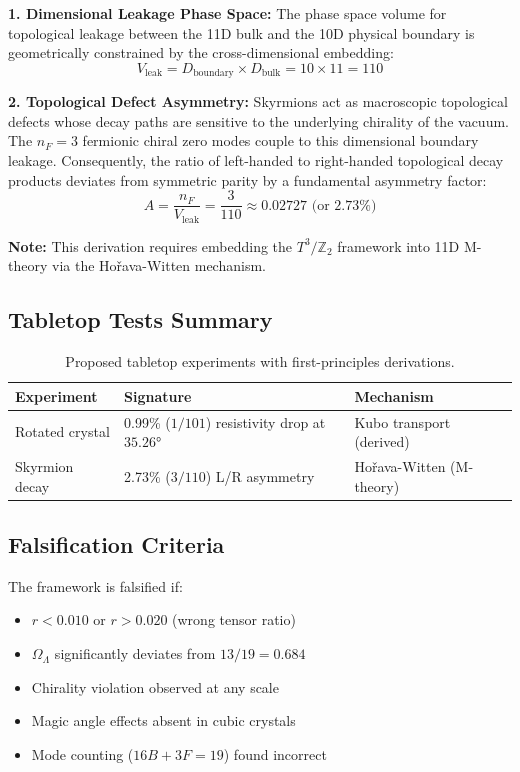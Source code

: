 \documentclass[12pt,a4paper]{article}
\newcommand{\Ztwo}{\mathbb{Z}_2}
\newcommand{\Tthree}{T^3}
\newcommand{\OmegaL}{\Omega_\Lambda}
\newcommand{\nF}{n_F}
\begin{document}
\textbf{1. Dimensional Leakage Phase Space:}
The phase space volume for topological leakage between the 11D bulk and the 10D physical boundary is geometrically constrained by the cross-dimensional embedding:
\begin{equation}
V_{\text{leak}} = D_{\text{boundary}} \times D_{\text{bulk}} = 10 \times 11 = 110
\end{equation}

\textbf{2. Topological Defect Asymmetry:}
Skyrmions act as macroscopic topological defects whose decay paths are sensitive to the underlying chirality of the vacuum. The $\nF = 3$ fermionic chiral zero modes couple to this dimensional boundary leakage. Consequently, the ratio of left-handed to right-handed topological decay products deviates from symmetric parity by a fundamental asymmetry factor:
\begin{equation}
A = \frac{\nF}{V_{\text{leak}}} = \frac{3}{110} \approx 0.02727 \text{ (or } 2.73\%)
\end{equation}

\textbf{Note:} This derivation requires embedding the $\Tthree/\Ztwo$ framework into 11D M-theory via the Hořava-Witten mechanism.

\subsection{Tabletop Tests Summary}

\begin{table}[H]
\centering
\begin{tabular}{lll}
\toprule
\textbf{Experiment} & \textbf{Signature} & \textbf{Mechanism} \\
\midrule
Rotated crystal & 0.99\% ($1/101$) resistivity drop at $35.26°$ & Kubo transport (derived) \\
Skyrmion decay & 2.73\% ($3/110$) L/R asymmetry & Hořava-Witten (M-theory) \\
\bottomrule
\end{tabular}
\caption{Proposed tabletop experiments with first-principles derivations.}
\end{table}

\subsection{Falsification Criteria}

The framework is falsified if:
\begin{itemize}
    \item $r < 0.010$ or $r > 0.020$ (wrong tensor ratio)
    \item $\OmegaL$ significantly deviates from $13/19 = 0.684$
    \item Chirality violation observed at any scale
    \item Magic angle effects absent in cubic crystals
    \item Mode counting ($16B + 3F = 19$) found incorrect
\end{itemize}
\end{document}
